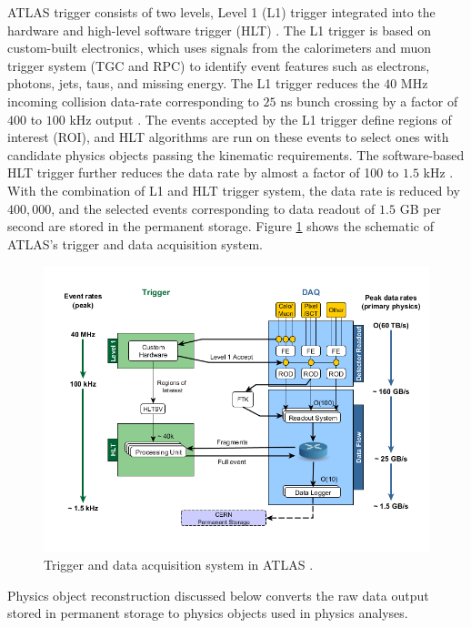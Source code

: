 ATLAS trigger consists of two levels, Level 1 (L1) trigger integrated into the hardware and high-level software trigger (HLT) \cite{TriggerSystemATLAS}. The L1 trigger is based on custom-built electronics, which uses signals from the calorimeters and muon trigger system (TGC and RPC) to identify event features such as electrons, photons, jets, taus, and missing energy. The L1 trigger reduces the $40$ MHz incoming collision data-rate corresponding to $25$ ns bunch crossing by a factor of $400$ to $100$ kHz output \cite{TriggerSystemATLAS}. The events accepted by the L1 trigger define regions of interest (ROI), and HLT algorithms are run on these events to select ones with candidate physics objects passing the kinematic requirements. The software-based HLT trigger further reduces the data rate by almost a factor of 100 to $1.5$ kHz \cite{ATLAS}. With the combination of L1 and HLT trigger system, the data rate is reduced by $400,000$, and the selected events corresponding to data readout of $1.5$ GB per second are stored in the permanent storage. Figure \ref{fig:DAQ} shows the schematic of ATLAS's trigger and data acquisition system. 

\begin{figure}[!htb]
    \centering
    \includegraphics[width=.8\linewidth]{figures/LHC/DAQ_ATLAS.png}
    \caption{ Trigger and data acquisition system in ATLAS \cite{ATLAS_DAQ}.\label{fig:DAQ}}
\end{figure}

Physics object reconstruction discussed below converts the raw data output stored in permanent storage to physics objects used in physics analyses. 

